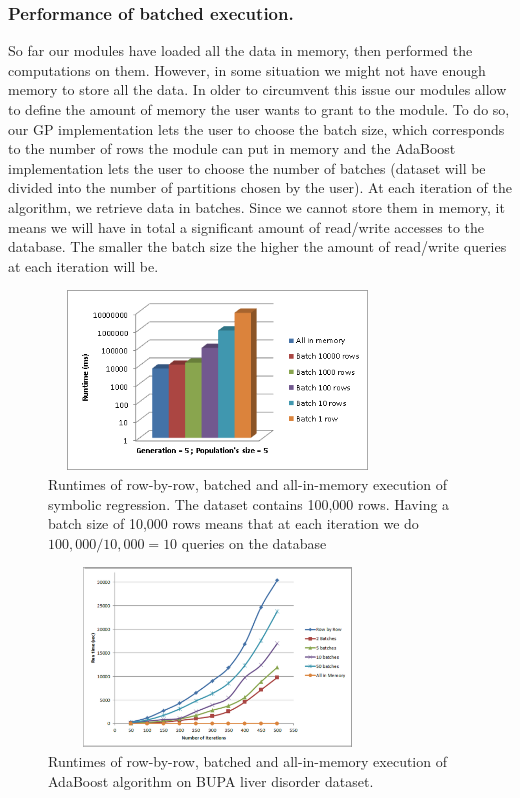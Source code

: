 \subsubsection*{Performance of batched execution.}
So far our modules have loaded all the data in memory, then performed the computations on them. However, in some situation we might not have enough memory to store all the data. In older to circumvent this issue our modules allow to define the amount of memory the user wants to grant to the module. To do so, our GP implementation lets the user to choose the batch size, which corresponds to the number of rows the module can put in memory and the AdaBoost implementation lets the user to choose the number of batches (dataset will be divided into the number of partitions chosen by the user). At each iteration of the algorithm, we retrieve data in batches. Since we cannot store them in memory, it means we will have in total a significant amount of read/write accesses to the database. The smaller the batch size the higher the amount of read/write queries at each iteration will be.
\begin{figure}[ht]
\centering
\includegraphics[width=0.8\textwidth,height=180px]{gp-batch-histo.png}
\caption{Runtimes of row-by-row, batched and all-in-memory execution of symbolic regression. The dataset contains 100,000 rows. Having a batch size of 10,000 rows means that at each iteration we do $100,000/10,000 = 10$ queries on the database}
\label{fig:gp-batch-histo}
\end{figure}
\begin{figure}[ht]
\centering
\includegraphics[width=0.8\textwidth,height=180px]{ada2.png}
\caption{Runtimes of row-by-row, batched and all-in-memory execution of AdaBoost algorithm on BUPA liver disorder dataset.}
\label{fig:adabatch1}
\end{figure}

